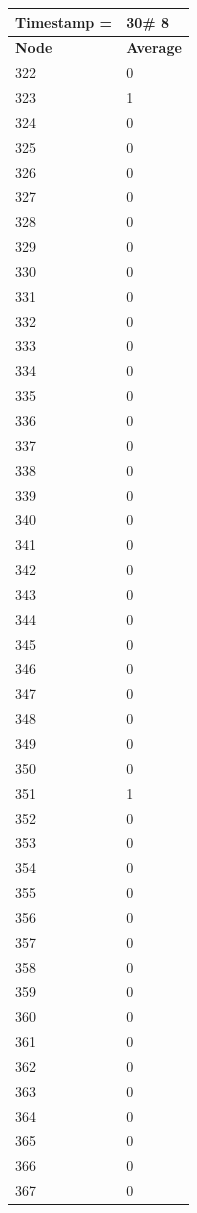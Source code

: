 \begin{tabular}{|l||l|}
\hline
\textbf{Timestamp =} & \textbf{30}\# 8\\\hline
	\textbf{Node} & \textbf{Average} \\ \hline
\hline
	322 & 0 \\ \hline
	323 & 1 \\ \hline
	324 & 0 \\ \hline
	325 & 0 \\ \hline
	326 & 0 \\ \hline
	327 & 0 \\ \hline
	328 & 0 \\ \hline
	329 & 0 \\ \hline
	330 & 0 \\ \hline
	331 & 0 \\ \hline
	332 & 0 \\ \hline
	333 & 0 \\ \hline
	334 & 0 \\ \hline
	335 & 0 \\ \hline
	336 & 0 \\ \hline
	337 & 0 \\ \hline
	338 & 0 \\ \hline
	339 & 0 \\ \hline
	340 & 0 \\ \hline
	341 & 0 \\ \hline
	342 & 0 \\ \hline
	343 & 0 \\ \hline
	344 & 0 \\ \hline
	345 & 0 \\ \hline
	346 & 0 \\ \hline
	347 & 0 \\ \hline
	348 & 0 \\ \hline
	349 & 0 \\ \hline
	350 & 0 \\ \hline
	351 & 1 \\ \hline
	352 & 0 \\ \hline
	353 & 0 \\ \hline
	354 & 0 \\ \hline
	355 & 0 \\ \hline
	356 & 0 \\ \hline
	357 & 0 \\ \hline
	358 & 0 \\ \hline
	359 & 0 \\ \hline
	360 & 0 \\ \hline
	361 & 0 \\ \hline
	362 & 0 \\ \hline
	363 & 0 \\ \hline
	364 & 0 \\ \hline
	365 & 0 \\ \hline
	366 & 0 \\ \hline
	367 & 0 \\ \hline
\end{tabular}
